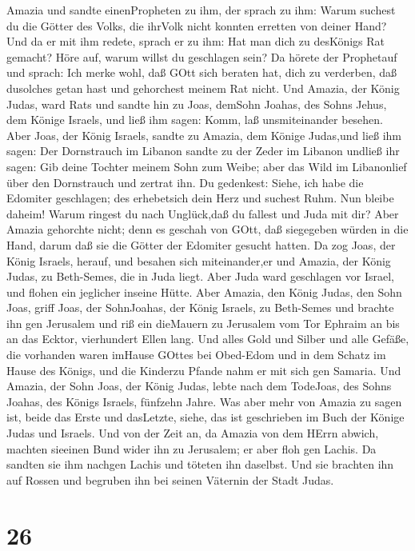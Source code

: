 Amazia und sandte einenPropheten zu ihm, der sprach zu ihm: Warum
suchest du die Götter des Volks, die ihrVolk nicht konnten erretten von
deiner Hand?  Und da er mit ihm redete, sprach er zu ihm:
Hat man dich zu desKönigs Rat gemacht? Höre auf, warum willst du
geschlagen sein? Da hörete der Prophetauf und sprach: Ich merke wohl,
daß GOtt sich beraten hat, dich zu verderben, daß dusolches getan hast
und gehorchest meinem Rat nicht.  Und Amazia, der König
Judas, ward Rats und sandte hin zu Joas, demSohn Joahas, des Sohns
Jehus, dem Könige Israels, und ließ ihm sagen: Komm, laß unsmiteinander
besehen.  Aber Joas, der König Israels, sandte zu Amazia,
dem Könige Judas,und ließ ihm sagen: Der Dornstrauch im Libanon sandte
zu der Zeder im Libanon undließ ihr sagen: Gib deine Tochter meinem Sohn
zum Weibe; aber das Wild im Libanonlief über den Dornstrauch und zertrat
ihn.  Du gedenkest: Siehe, ich habe die Edomiter
geschlagen; des erhebetsich dein Herz und suchest Ruhm. Nun bleibe
daheim! Warum ringest du nach Unglück,daß du fallest und Juda mit dir?
 Aber Amazia gehorchte nicht; denn es geschah von GOtt, daß
siegegeben würden in die Hand, darum daß sie die Götter der Edomiter
gesucht hatten.  Da zog Joas, der König Israels, herauf,
und besahen sich miteinander,er und Amazia, der König Judas, zu
Beth-Semes, die in Juda liegt.  Aber Juda ward geschlagen
vor Israel, und flohen ein jeglicher inseine Hütte.  Aber
Amazia, den König Judas, den Sohn Joas, griff Joas, der SohnJoahas, der
König Israels, zu Beth-Semes und brachte ihn gen Jerusalem und riß ein
dieMauern zu Jerusalem vom Tor Ephraim an bis an das Ecktor, vierhundert
Ellen lang.  Und alles Gold und Silber und alle Gefäße, die
vorhanden waren imHause GOttes bei Obed-Edom und in dem Schatz im Hause
des Königs, und die Kinderzu Pfande nahm er mit sich gen Samaria.
 Und Amazia, der Sohn Joas, der König Judas, lebte nach dem
TodeJoas, des Sohns Joahas, des Königs Israels, fünfzehn Jahre.
 Was aber mehr von Amazia zu sagen ist, beide das Erste und
dasLetzte, siehe, das ist geschrieben im Buch der Könige Judas und
Israels.  Und von der Zeit an, da Amazia von dem HErrn
abwich, machten sieeinen Bund wider ihn zu Jerusalem; er aber floh gen
Lachis. Da sandten sie ihm nachgen Lachis und töteten ihn daselbst.
 Und sie brachten ihn auf Rossen und begruben ihn bei
seinen Väternin der Stadt Judas.

\hypertarget{section-25}{%
\section{26}\label{section-25}}

